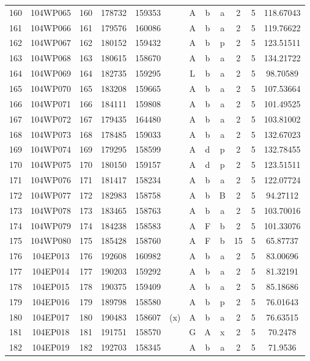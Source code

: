 \begin{tabular}{|*{12}{c|}}
160 & 104WP065 & 160 & 178732 & 159353 &  & A & b & a & 2 & 5 & 118.67043 \\ 
161 & 104WP066 & 161 & 179576 & 160086 &  & A & b & a & 2 & 5 & 119.76622 \\ 
162 & 104WP067 & 162 & 180152 & 159432 &  & A & b & p & 2 & 5 & 123.51511 \\ 
163 & 104WP068 & 163 & 180615 & 158670 &  & A & b & a & 2 & 5 & 134.21722 \\ 
164 & 104WP069 & 164 & 182735 & 159295 &  & L & b & a & 2 & 5 & 98.70589 \\ 
165 & 104WP070 & 165 & 183208 & 159665 &  & A & b & a & 2 & 5 & 107.53664 \\ 
166 & 104WP071 & 166 & 184111 & 159808 &  & A & b & a & 2 & 5 & 101.49525 \\ 
167 & 104WP072 & 167 & 179435 & 164480 &  & A & b & a & 2 & 5 & 103.81002 \\ 
168 & 104WP073 & 168 & 178485 & 159033 &  & A & b & a & 2 & 5 & 132.67023 \\ 
169 & 104WP074 & 169 & 179295 & 158599 &  & A & d & p & 2 & 5 & 132.78455 \\ 
170 & 104WP075 & 170 & 180150 & 159157 &  & A & d & p & 2 & 5 & 123.51511 \\ 
171 & 104WP076 & 171 & 181417 & 158234 &  & A & b & a & 2 & 5 & 122.07724 \\ 
172 & 104WP077 & 172 & 182983 & 158758 &  & A & b & B & 2 & 5 & 94.27112 \\ 
173 & 104WP078 & 173 & 183465 & 158763 &  & A & b & a & 2 & 5 & 103.70016 \\ 
174 & 104WP079 & 174 & 184238 & 158583 &  & A & F & b & 2 & 5 & 101.33076 \\ 
175 & 104WP080 & 175 & 185428 & 158760 &  & A & F & b & 15 & 5 & 65.87737 \\ 
176 & 104EP013 & 176 & 192608 & 160982 &  & A & b & a & 2 & 5 & 83.00696 \\ 
177 & 104EP014 & 177 & 190203 & 159292 &  & A & b & a & 2 & 5 & 81.32191 \\ 
178 & 104EP015 & 178 & 190375 & 159409 &  & A & b & a & 2 & 5 & 85.18686 \\ 
179 & 104EP016 & 179 & 189798 & 158580 &  & A & b & p & 2 & 5 & 76.01643 \\ 
180 & 104EP017 & 180 & 190483 & 158607 & (x) & A & b & a & 2 & 5 & 76.63515 \\ 
181 & 104EP018 & 181 & 191751 & 158570 &  & G & A & x & 2 & 5 & 70.2478 \\ 
182 & 104EP019 & 182 & 192703 & 158345 &  & A & b & a & 2 & 5 & 71.9536 \\ 

\end{tabular}
